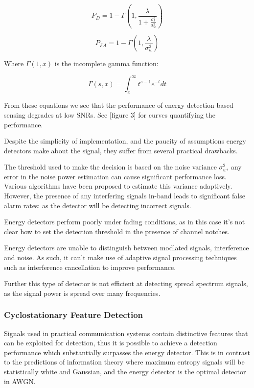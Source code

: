 \begin{equation}
P_D = 1 - \Gamma\left(1, \frac{\lambda}{1 + \frac{ \sigma_s^2 }{ \sigma_w^2 } } \right)
\end{equation}

\begin{equation}
P_{FA} = 1 - \Gamma\left(1, \frac{\lambda}{\sigma_w^2} \right)
\end{equation}

Where \( \Gamma\left(1,x\right)\) is the incomplete gamma function: 

\begin{equation}
 \Gamma\left(s,x\right) = \int_x^{\infty} t^{s-1}e^{-t}dt
\end{equation}

From these equations we see that the performance of energy detection based sensing degrades at low SNRs. See \cite{Yucek2009}[figure 3] for curves quantifying the performance. 

Despite the simplicity of implementation, and the paucity of assumptions energy detectors make about the signal, they suffer from several practical drawbacks. 

The threshold used to make the decision is based on the noise variance \(\sigma_w^2\), any error in the noise power estimation can cause significant performance loss. Various algorithms have been proposed to estimate this variance adaptively. However, the presence of any interfering signals in-band leads to significant false alarm rates: as the detector will be detecting incorrect signals.

Energy detectors perform poorly under fading conditions, as in this case it's not clear how to set the detection threshold in the presence of channel notches. 

Energy detectors are unable to distinguish between modlated signals, interference and noise. As such, it can't make use of adaptive signal processing techniques such as interference cancellation to improve performance. 

Further this type of detector is not efficient at detecting spread spectrum signals, as the signal power is spread over many frequencies.

\subsubsection{Cyclostationary Feature Detection}
Signals used in practical communication systems contain distinctive features that can be exploited for detection, thus it is possible to achieve a detection performance which substantially surpasses the energy detector. This is in contrast to the predictions of information theory where maximum entropy signals will be statistically white and Gaussian, and the energy detector is the optimal detector in AWGN.

